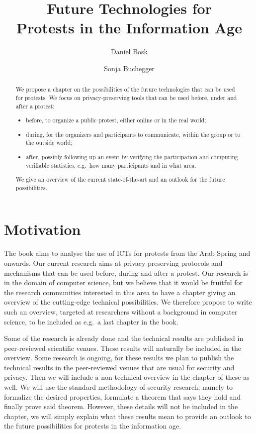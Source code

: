 \documentclass[a4paper]{llncs}
\title{%
  Future Technologies for\\
  Protests in the Information Age
}
\author{%
  Daniel Bosk
  \and
  Sonja Buchegger
}
\institute{%
  School of Computer Science and Communication,\\
  KTH Royal Institute of Technology,
  Stockholm\\
  \email{\{dbosk,buc\}@kth.se}
}
\begin{document}
\maketitle

\begin{abstract}
  We propose a chapter on the possibilities of the future technologies that can 
  be used for protests.
  We focus on privacy-preserving tools that can be used before, under and after 
  a protest:
  \begin{itemize}
    \item before, to organize a public protest, either online or in the real 
      world;
    \item during, for the organizers and participants to communicate, within 
      the group or to the outside world;
    \item after, possibly following up an event by verifying the participation 
      and computing verifiable statistics, e.g.\ how many participants and in 
      what area.
  \end{itemize}
  We give an overview of the current state-of-the-art and an outlook for the 
  future possibilities.
\end{abstract}


\section{Motivation}
\label{Motivation}

The book aims to analyse the use of \acp{ICT} for protests from the Arab Spring 
and onwards.
Our current research aims at privacy-preserving protocols and mechanisms that 
can be used before, during and after a protest.
Our research is in the domain of computer science, but we believe that it would 
be fruitful for the research communities interested in this area to have 
a chapter giving an overview of the cutting-edge technical possibilities.
We therefore propose to write such an overview, targeted at researchers without 
a background in computer science, to be included as e.g.\ a last chapter in the 
book.

Some of the research is already done and the technical results are published in 
peer-reviewed scientific venues.
These results will naturally be included in the overview.
Some research is ongoing, for these results we plan to publish the technical 
results in the peer-reviewed venues that are usual for security and privacy.
Then we will include a non-technical overview in the chapter of these as well.
We will use the standard methodology of security research; namely to formalize 
the desired properties, formulate a theorem that says they hold and finally 
prove said theorem.
However, these details will not be included in the chapter, we will simply 
explain what these results mean to provide an outlook to the future 
possibilities for protests in the information age.
\end{document}
